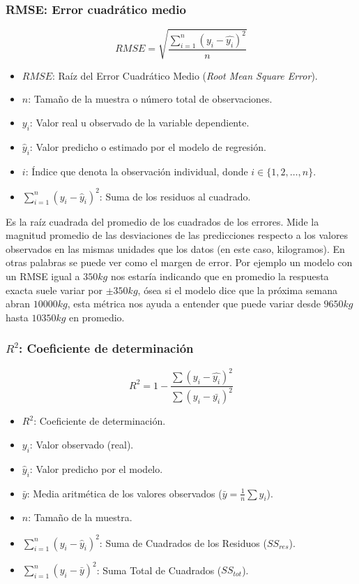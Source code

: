 \documentclass[11pt,a4paper]{article}
\begin{document}
\subsubsection*{RMSE: Error cuadrático medio}

\begin{equation}
  RMSE = \sqrt{\frac{\sum_{i=1}^{n}(y_i-\hat{y_i})^2}{n}}
\end{equation}

\begin{itemize}
    \item $RMSE$: Raíz del Error Cuadrático Medio (\textit{Root Mean Square Error}).
    \item $n$: Tamaño de la muestra o número total de observaciones.
    \item $y_i$: Valor real u observado de la variable dependiente.
    \item $\hat{y}_i$: Valor predicho o estimado por el modelo de regresión.
    \item $i$: Índice que denota la observación individual, donde $i \in \{1, 2, \dots, n\}$.
    \item $\sum_{i=1}^{n} (y_i - \hat{y}_i)^2$: Suma de los residuos al cuadrado.
\end{itemize}
Es la raíz cuadrada del promedio de los cuadrados de los errores. Mide la magnitud promedio de las desviaciones de las predicciones respecto a los valores observados en las mismas unidades que los datos (en este caso, kilogramos). En otras palabras se puede ver como el margen de error. Por ejemplo un modelo con un RMSE igual a $350kg$ nos estaría indicando que en promedio la respuesta exacta suele variar por $\pm 350kg$, ósea si el modelo dice que la próxima semana abran $10000kg$, esta métrica nos ayuda a entender que puede variar desde $9650kg$ hasta $10350kg$ en promedio.

\subsubsection*{$R^2$: Coeficiente de determinación}

\begin{equation}
  R^2 = 1 - \frac{\sum(y_i-\hat{y_i})^2}{\sum(y_i-\bar{y_i})^2}
\end{equation}

\begin{itemize}
    \item $R^2$: Coeficiente de determinación.
    \item $y_i$: Valor observado (real).
    \item $\hat{y}_i$: Valor predicho por el modelo.
    \item $\bar{y}$: Media aritmética de los valores observados ($\bar{y} = \frac{1}{n} \sum y_i$).
    \item $n$: Tamaño de la muestra.
    \item $\sum_{i=1}^{n} (y_i - \hat{y}_i)^2$: Suma de Cuadrados de los Residuos ($SS_{res}$).
    \item $\sum_{i=1}^{n} (y_i - \bar{y})^2$: Suma Total de Cuadrados ($SS_{tot}$).
\end{itemize}
\end{document}
